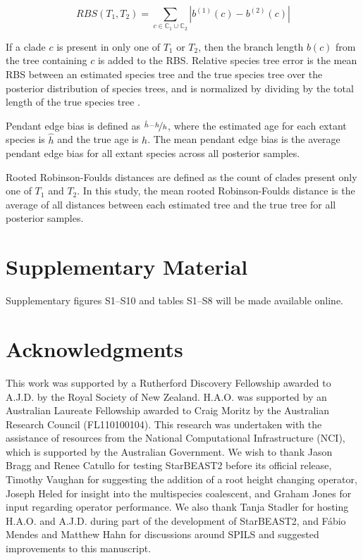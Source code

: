 \documentclass[12pt]{article}
\begin{document}
\begin{equation}
RBS(T_1, T_2) = \sum_{c \in {\mathbb{C}_1} \cup {\mathbb{C}_2}} |b^{(1)}(c) - b^{(2)}(c)|
\end{equation}

If a clade $c$ is present in only one of $T_1$ or $T_2$, then the branch length
$b(c)$ from the tree containing $c$ is added to the RBS. Relative species tree
error is the mean RBS between an estimated species tree and the true
species tree over the posterior distribution of species trees, and is normalized
by dividing by the total length of the true species tree
\citep{Ogilvie01052016}.

Pendant edge bias is defined as $\nicefrac{\hat{h} - h}{h}$, where the estimated
age for each extant species is $\hat{h}$ and the true age is $h$. The mean
pendant edge bias is the average pendant edge bias for all extant species across
all posterior samples.

Rooted Robinson-Foulds distances \citep{ROBINSON1981131} are defined as the
count of clades present only one of $T_1$ and $T_2$. In this study, the mean
rooted Robinson-Foulds distance is the average of all distances between each
estimated tree and the true tree for all posterior samples.

\section{Supplementary Material}
Supplementary figures S1--S10 and tables S1--S8 will be made available online.

\section{Acknowledgments}

This work was supported by a Rutherford Discovery Fellowship awarded to A.J.D.
by the Royal Society of New Zealand. H.A.O. was supported by an Australian
Laureate Fellowship awarded to Craig Moritz by the Australian Research Council
(FL110100104). This research was undertaken with the assistance of resources
from the National Computational Infrastructure (NCI), which is supported by the
Australian Government. We wish to thank Jason Bragg and Renee Catullo for
testing StarBEAST2 before its official release, Timothy Vaughan for suggesting
the addition of a root height changing operator, Joseph Heled for insight into
the multispecies coalescent, and Graham Jones for input regarding operator
performance. We also thank Tanja Stadler for hosting H.A.O. and A.J.D. during part of the
development of StarBEAST2, and F\'abio Mendes and Matthew Hahn for discussions around
SPILS and suggested improvements to this manuscript.



\end{document}
